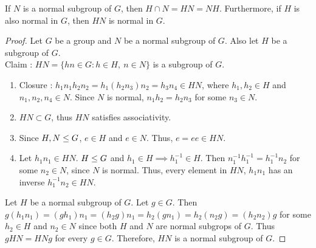 \begin{lemma}
	If $N$ is a normal subgroup of $G$, then $H \cap N = HN = NH$.
	Furthermore, if $H$ is also normal in $G$, then $HN$ is normal in $G$.
\end{lemma}
\begin{proof}
	Let $G$ be a group and $N$ be a normal subgroup of $G$.
	Also let $H$ be a subgroup of $G$.\\
	Claim : $HN = \{ hn \in G : h \in H,\ n \in N \}$ is a subgroup of $G$.
	\begin{enumerate}[label=G\arabic*]
		\item Closure : $h_1n_1h_2n_2 = h_1(h_2n_3)n_2 = h_3n_4 \in HN$, where $h_1,h_2 \in H$ and $n_1,n_2,n_4 \in N$. Since $N$ is normal, $n_1h_2 = h_2n_3$ for some $n_3 \in N$.
		\item $HN \subset G$, thus $HN$ satisfies associativity.
		\item Since $H,N \le G$, $e \in H$ and $e \in N$. Thus, $e = ee \in HN$.
		\item Let $h_1n_1 \in HN$. $H \le G$ and $h_1 \in H \implies h_1^{-1} \in H$. Then $n_1^{-1}h_1^{-1} = h_1^{-1}n_2$ for some $n_2 \in N$, since $N$ is normal. Thus, every element in $HN$, $h_1n_1$ has an inverse $h_1^{-1}n_2 \in HN$.
	\end{enumerate}
	Let $H$ be a normal subgroup of $G$.
	Let $g \in G$.
	Then $g(h_1n_1) = (gh_1)n_1 = (h_2g)n_1 = h_2(gn_1) = h_2(n_2g) = (h_2n_2)g$ for some $h_2 \in H$ and $n_2 \in N$ since both $H$ and $N$ are normal subgrops of $G$.
	Thus $gHN = HNg$ for every $g \in G$.
	Therefore, $HN$ is a normal subgroup of $G$.
\end{proof}

